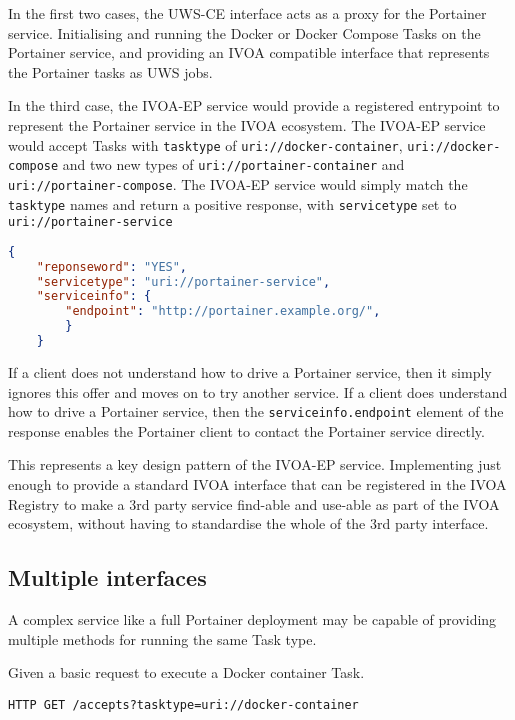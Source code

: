 \documentclass[11pt,a4paper]{ivoa}
\newcommand{\uws} {UWS\xspace}
\newcommand{\uwsce} {UWS-CE\xspace}
\newcommand{\ivoep} {IVOA-EP\xspace}
\newcommand{\docker} {Docker\xspace}
\newcommand{\dockercompose} {Docker Compose\xspace}
\newcommand{\portainer} {Portainer\xspace}
\newcommand{\codeword}[1] {\texttt{#1}}
\begin{document}
In the first two cases, the \uwsce interface acts as a proxy for the \portainer service. Initialising and running the \docker or \dockercompose Tasks on the \portainer service, and providing an IVOA compatible interface that represents the \portainer tasks as \uws jobs.

In the third case, the \ivoep service would provide a registered entrypoint to represent the \portainer service in the IVOA ecosystem.
The \ivoep service would accept Tasks with \codeword{tasktype} of \codeword{uri://docker-container}, \codeword{uri://docker-compose} and two new types of \codeword{uri://portainer-container} and  \codeword{uri://portainer-compose}.
The \ivoep service would simply match the \codeword{tasktype} names and return a positive response, with \codeword{servicetype} set to \codeword{uri://portainer-service}

\begin{lstlisting}[language=json]
    {
    "reponseword": "YES",
    "servicetype": "uri://portainer-service",
    "serviceinfo": {
        "endpoint": "http://portainer.example.org/",
        }
    }
\end{lstlisting}

If a client does not understand how to drive a \portainer service, then it simply ignores this offer and moves on to try another service.
If a client does understand how to drive a \portainer service, then the \codeword{serviceinfo.endpoint} element of the response enables the \portainer client to contact the \portainer service directly.

This represents a key design pattern of the \ivoep service. Implementing just enough to provide a standard IVOA interface that can be registered in the IVOA Registry to make a 3rd party service find-able and use-able as part of the IVOA ecosystem, without having to standardise the whole of the 3rd party interface.

\subsection{Multiple interfaces}
\label{sec:multiple-interfaces}
A complex service like a full \portainer deployment may be capable of providing multiple methods for running the same Task type.

Given a basic request to execute a \docker container Task.
\begin{lstlisting}[]
    HTTP GET /accepts?tasktype=uri://docker-container
\end{lstlisting}
\end{document}
